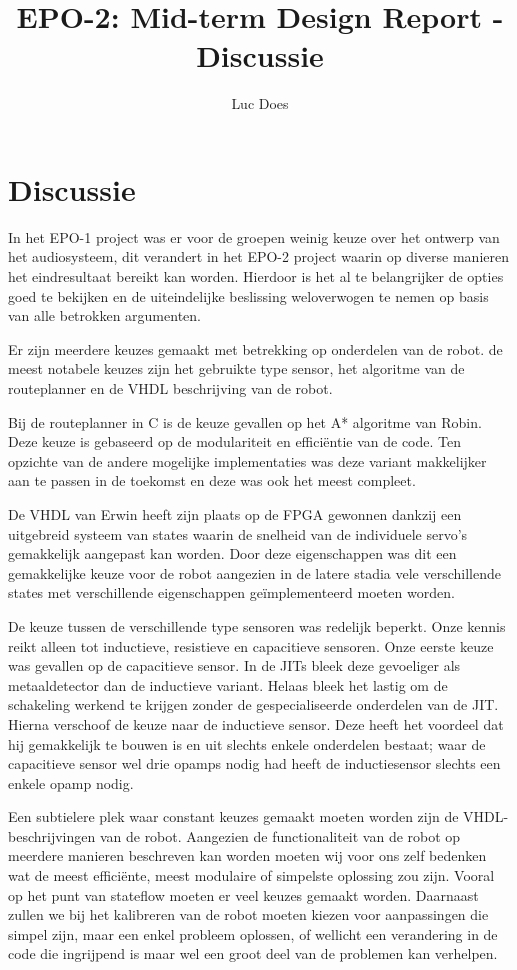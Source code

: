 \documentclass{report}
\title{EPO-2: Mid-term Design Report - Discussie}
\author{Luc Does}
\begin{document}
\chapter{Discussie}
\label{ch:discussie}

In het EPO-1 project was er voor de groepen weinig keuze over het ontwerp van het audiosysteem, dit verandert in het EPO-2 project waarin op diverse manieren het eindresultaat bereikt kan worden. Hierdoor is het al te belangrijker de opties goed te bekijken en de uiteindelijke beslissing weloverwogen te nemen op basis van alle betrokken argumenten. \newline

Er zijn meerdere keuzes gemaakt met betrekking op onderdelen van de robot. de meest notabele keuzes zijn het gebruikte type sensor, het algoritme van de routeplanner en de VHDL beschrijving van de robot. \newline

Bij de routeplanner in C is de keuze  gevallen op het A* algoritme van Robin. Deze keuze is gebaseerd op de modulariteit en efficiëntie van de code. Ten opzichte van de andere mogelijke implementaties was deze variant makkelijker aan te passen in de toekomst en deze was ook het meest compleet. \newline

De VHDL van Erwin heeft zijn plaats op de FPGA gewonnen dankzij een uitgebreid systeem van states waarin de snelheid van de individuele servo's gemakkelijk aangepast kan worden. Door deze eigenschappen was dit een gemakkelijke keuze voor de robot aangezien in de latere stadia vele verschillende states met verschillende eigenschappen geïmplementeerd moeten worden. \newline

De keuze tussen de verschillende type sensoren was redelijk beperkt. Onze kennis reikt alleen tot inductieve, resistieve en capacitieve sensoren. Onze eerste keuze was gevallen op de capacitieve sensor. In de JITs bleek deze gevoeliger als metaaldetector dan de inductieve variant. Helaas bleek het lastig om de schakeling werkend te krijgen zonder de gespecialiseerde onderdelen van de JIT. Hierna verschoof de keuze naar de inductieve sensor. Deze heeft het voordeel dat hij gemakkelijk te bouwen is en uit slechts enkele onderdelen bestaat; waar de capacitieve sensor wel drie opamps nodig had heeft de inductiesensor slechts een enkele opamp nodig. \newline

Een subtielere plek waar constant keuzes gemaakt moeten worden zijn de VHDL-beschrijvingen van de robot. Aangezien de functionaliteit van de robot op meerdere manieren beschreven kan worden moeten wij voor ons zelf bedenken wat de meest efficiënte, meest modulaire of simpelste oplossing zou zijn. Vooral op het punt van stateflow moeten er veel keuzes gemaakt worden. Daarnaast zullen we bij het kalibreren van de robot moeten kiezen voor aanpassingen die simpel zijn, maar een enkel probleem oplossen, of wellicht een verandering in de code die ingrijpend is maar wel een groot deel van de problemen kan verhelpen.
\end{document}
